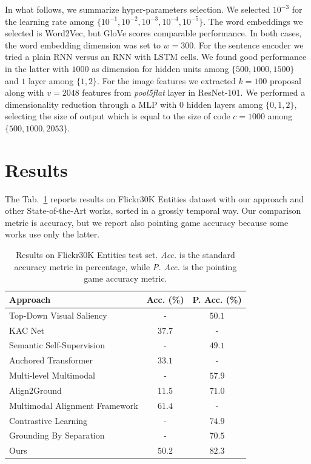 In what follows, we summarize hyper-parameters selection. We selected
$10^{-3}$ for the learning rate among $\{ 10^{-1}, 10^{-2}, 10^{-3},
10^{-4}, 10^{-5} \}$. The word embeddings we selected is Word2Vec, but
GloVe scores comparable performance. In both cases, the word embedding
dimension was set to $w = 300$. For the sentence encoder we tried a
plain RNN versus an RNN with LSTM cells. We found good performance in
the latter with $1000$ as dimension for hidden units among $\{ 500,
1000, 1500 \}$  and $1$ layer among $\{ 1, 2 \}$. For the image
features we extracted $k = 100$ proposal along with $v = 2048$
features from \textit{pool5\textunderscore flat} layer in ResNet-101.
We performed a dimensionality reduction through a MLP with $0$ hidden
layers among $\{ 0, 1, 2 \}$, selecting the size of output which is
equal to the size of code $c = 1000$ among $\{ 500, 1000, 2053 \}$.

\section{Results}
\label{sec:results}

The Tab.~\ref{tab:results-flickr30k} reports results on Flickr30K
Entities dataset with our approach and other State-of-the-Art works,
sorted in a grossly temporal way. Our comparison metric is accuracy,
but we report also pointing game accuracy because some works use only
the latter. 

\begin{table}
  \centering
  \begin{tabular}{lcc}
    \toprule
    Approach & Acc. (\%) & P. Acc. (\%) \\
    \midrule
    Top-Down Visual Saliency \cite{ramanishka2017top}        & -      & $50.1$ \\
    KAC Net \cite{chen2018knowledge}                         & $37.7$ & -      \\
    Semantic Self-Supervision \cite{javed2018learning}       & -      & $49.1$ \\
    Anchored Transformer \cite{zhao2018weakly}               & $33.1$ & -      \\
    Multi-level Multimodal \cite{akbari2019multi}            & -      & $57.9$ \\
    Align2Ground \cite{datta2019align2ground}                & $11.5$ & $71.0$ \\
    Multimodal Alignment Framework \cite{wang2020maf}        & $\bm{61.4}$ & -    \\
    Contrastive Learning \cite{gupta2020contrastive}         & -      & $74.9$ \\
    Grounding By Separation \cite{arbelle2021detector}       & -      & $70.5$ \\
    \midrule
    Ours                                                     & $50.2$ & $82.3$ \\
    \bottomrule
  \end{tabular}
  \caption[Results on Flickr30K Entities test set]{Results on
  Flickr30K Entities test set. \textit{Acc.} is the standard accuracy
  metric in percentage, while \textit{P. Acc.} is the pointing game
  accuracy metric.}
  \label{tab:results-flickr30k}
\end{table}

